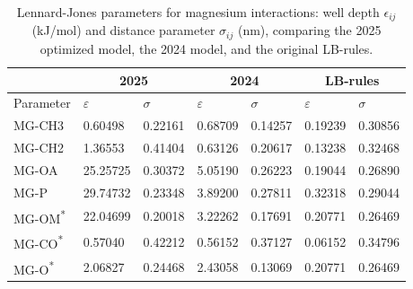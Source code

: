 \documentclass[12pt,openany,final]{book}
\begin{document}
\begin{table}[h!]
\centering
\begin{tabularx}{\textwidth}{|X|X|X|X|X|X|X|}
\hline
                         & \multicolumn{2}{c|}{\textbf{2025}} & \multicolumn{2}{c|}{\textbf{2024}} & \multicolumn{2}{c|}{\textbf{LB-rules}} \\\hline
Parameter                & \boldmath$\varepsilon$             & \boldmath$\sigma$                  & \boldmath$\varepsilon$                          & \boldmath$\sigma$ & \boldmath$\varepsilon$ & \boldmath$\sigma$ \\\hline
MG-CH3                   & 0.60498                            & 0.22161                            & 0.68709                                         & 0.14257           & 0.19239                & 0.30856 \\\hline
MG-CH2                   & 1.36553                            & 0.41404                            & 0.63126                                         & 0.20617           & 0.13238                & 0.32468 \\\hline
MG-OA                    & 25.25725                           & 0.30372                            & 5.05190                                         & 0.26223           & 0.19044                & 0.26890 \\\hline
MG-P                     & 29.74732                           & 0.23348                            & 3.89200                                         & 0.27811           & 0.32318                & 0.29044 \\\hline
MG-OM\textsuperscript{*} & 22.04699                           & 0.20018                            & 3.22262                                         & 0.17691           & 0.20771                & 0.26469 \\\hline
MG-CO\textsuperscript{*} & 0.57040                            & 0.42212                            & 0.56152                                         & 0.37127           & 0.06152                & 0.34796 \\\hline
MG-O\textsuperscript{*}  & 2.06827                            & 0.24468                            & 2.43058                                         & 0.13069           & 0.20771                & 0.26469 \\\hline
\end{tabularx}
\caption[Lennard-Jones parameters for magnesium interactions]{Lennard-Jones parameters for magnesium interactions: well depth $\epsilon_{ij}$ (kJ/mol) and distance parameter $\sigma_{ij}$ (nm), comparing the 2025 optimized model, the 2024 model, and the original LB-rules.}
\label{tab:params}
\end{table}
\end{document}
